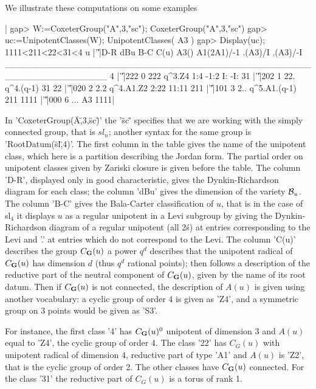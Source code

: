 We illustrate these computations on some examples\:

|    gap> W:=CoxeterGroup("A",3,"sc");
    CoxeterGroup("A",3,"sc")
    gap> uc:=UnipotentClasses(W);
    UnipotentClasses( A3 )
    gap> Display(uc);
    1111<211<22<31<4
       u |'\|'|D-R dBu B-C         C(u) A3() A1(2A1)/-1 .(A3)/I .(A3)/-I
    ________________________________________________________________
    4    |'\|'|222   0 222       q^3.Z4  1:4       -1:2      I:      -I:
    31   |'\|'|202   1 22.    q^4.(q-1)   31
    22   |'\|'|020   2 2.2    q^4.A1.Z2 2:22      11:11
    211  |'\|'|101   3 2.. q^5.A1.(q-1)  211
    1111 |'\|'|000   6 ...           A3 1111|

In  'CoxeterGroup(\"A\",3,\"sc\")'  the  '\"sc\"'  specifies  that  we  are
working with the simply connected group, that is $sl_n$; another syntax for
the  same group  is 'RootDatum(\"sl\",4)'.  The first  column in  the table
gives the name of the unipotent class, which here is a partition describing
the  Jordan form. The  partial order on  unipotent classes given by Zariski
closure is given before the table. The column 'D-R', displayed only in good
characteristic,  gives the  Dynkin-Richardson diagram  for each  class; the
column  'dBu' gives the dimension of  the variety ${\mathcal B}_u$. The column 'B-C'
gives  the Bala-Carter classification of $u$, that is in the case of sl$_4$
it  displays $u$ as  a regular unipotent  in a Levi  subgroup by giving the
Dynkin-Richardson  diagram  of  a  regular  unipotent (all 2\'s) at entries
corresponding to the Levi and '.' at entries which do not correspond to the
Levi.  The column  'C(u)' describes  the group  $C_{\bf G}(u)$\: a  power $q^d$
describes  that the unipotent radical of $C_{\bf G}(u)$ has dimension $d$ (thus
$q^d$ rational points); then follows a description of the reductive part of
the  neutral component of $C_{\bf G}(u)$, given by  the name of its root datum.
Then  if $C_{\bf G}(u)$  is not  connected, the  description of $A(u)$ is given
using another vocabulary: a cyclic group of order 4 is given as 'Z4', and a
symmetric group on 3 points would be given as 'S3'.

For  instance, the first class '4'  has $C_{\bf G}(u)^0$ unipotent of dimension
$3$  and $A(u)$ equal to 'Z4', the cyclic  group of order 4. The class '22'
has  $C_G(u)$ with  unipotent radical  of dimension  $4$, reductive part of
type  'A1' and  $A(u)$ is  'Z2', that  is the  cyclic group of order 2. The
other  classes have $C_{\bf G}(u)$ connected. For  the class '31' the reductive
part of $C_G(u)$ is a torus of rank 1.

